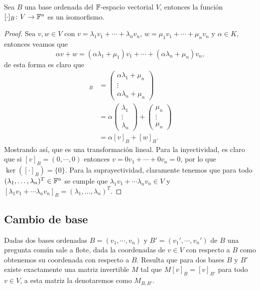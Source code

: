 \begin{prop}
  Sea $B$ una base ordenada del $\mathbb{F}$-espacio vectorial $V$, entonces la función $[\cdot]_B\colon V \to \mathbb{F}^n$ es un isomorfismo.
\end{prop}
\begin{proof}
  Sea $v,w \in V$ con $v = \lambda_1 v_1 + \cdots + \lambda_n v_n$, $w = \mu_1 v_1 + \cdots + \mu_n v_n$ y $\alpha \in K$, entonces veamos que
  \[
  \alpha v+w =  (\alpha\lambda_1+\mu_1) v_1 + \cdots + (\alpha\lambda_n+\mu_n) v_n,
  \]
  de esta forma es claro que
  \begin{align*}
    [v+w]_B 
      &= \begin{pmatrix} \alpha\lambda_1+\mu_n \\ \vdots \\ \alpha\lambda_n+\mu_n \end{pmatrix} \\
      &= \alpha\begin{pmatrix} \lambda_1 \\ \vdots \\ \lambda_n \end{pmatrix}
       + \begin{pmatrix} \mu_n \\ \vdots \\ \mu_n  \end{pmatrix} \\
      &= \alpha[v]_B + [w]_B.
  \end{align*}
  Mostrando así, que es una transformación lineal. Para la inyectividad, es claro que si $[v]_B = (0,\cdots,0)$ entonces $v = 0v_1 + \cdots + 0v_n = 0$, por lo que $\ker([\cdot]_B) = \{0\}$. Para la suprayectividad, claramente tenemos que para todo $(\lambda_1, \ldots, \lambda_n)^T \in \mathbb{F}^n$ se cumple que $\lambda_1 v_1 + \cdots \lambda_n v_n \in V$ y  $[\lambda_1 v_1 + \cdots \lambda_n v_n]_B = (\lambda_1, \ldots, \lambda_n)^T$.
\end{proof}


\subsection{Cambio de base}

Dadas dos bases ordenadas $B = (v_1,\cdots,v_n)$ y $B' = (v_1',\cdots,v_n')$ de $B$ una pregunta común sale a flote, dada la coordenadas de $v \in V$ con respecto a $B$ como obtenemos su coordenada con respecto a $B$. Resulta que para dos bases $B$ y $B'$ existe exactamente una matriz invertible $M$ tal que $M[v]_B = [v]_{B'}$ para todo $v \in V$, a esta matriz la denotaremos como $M_{B,B'}$.


